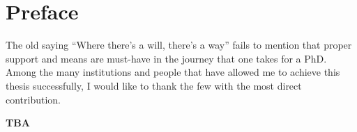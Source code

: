 \chapter*{Preface}
\label{ch:acknowledgements}

The old saying \enquote{Where there's a will, there's a way} fails to mention
that proper support and means are must-have in the journey
that one takes for a PhD.
Among the many institutions and people
that have allowed me to achieve this thesis successfully,
I would like to thank the few with the most direct contribution.

\textbf{TBA}

